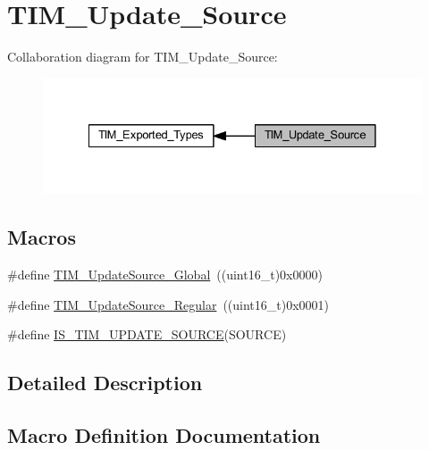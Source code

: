 \hypertarget{group___t_i_m___update___source}{}\section{T\+I\+M\+\_\+\+Update\+\_\+\+Source}
\label{group___t_i_m___update___source}
Collaboration diagram for T\+I\+M\+\_\+\+Update\+\_\+\+Source\+:
\nopagebreak
\begin{figure}[H]
\begin{center}
\leavevmode
\includegraphics[width=328pt]{group___t_i_m___update___source}
\end{center}
\end{figure}
\subsection*{Macros}
\begin{DoxyCompactItemize}
\item 
\#define \hyperlink{group___t_i_m___update___source_ga32c67bc3f8211a2c7b44ee9fe1523875}{T\+I\+M\+\_\+\+Update\+Source\+\_\+\+Global}~((uint16\+\_\+t)0x0000)
\item 
\#define \hyperlink{group___t_i_m___update___source_ga6f50423cdb011137ae8cd303ccd2080c}{T\+I\+M\+\_\+\+Update\+Source\+\_\+\+Regular}~((uint16\+\_\+t)0x0001)
\item 
\#define \hyperlink{group___t_i_m___update___source_ga7c916798d8f5f4a828afadceb5d38a95}{I\+S\+\_\+\+T\+I\+M\+\_\+\+U\+P\+D\+A\+T\+E\+\_\+\+S\+O\+U\+R\+CE}(S\+O\+U\+R\+CE)
\end{DoxyCompactItemize}


\subsection{Detailed Description}


\subsection{Macro Definition Documentation}
\mbox{\label{group___t_i_m___update___source_ga7c916798d8f5f4a828afadceb5d38a95}} 
